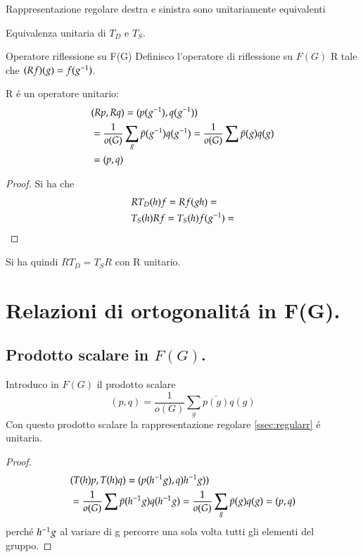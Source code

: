 \documentclass[oneside,12pt]{memoir}
\begin{document}
\begin{usefull}{Rappresentazione regolare destra e sinistra sono unitariamente equivalenti}

Equivalenza unitaria di $T_D$ e $T_S$.

\begin{definition}{Operatore riflessione su F(G)}
Definisco l'operatore di riflessione su $F(G)$ R tale che $(Rf)(g)=f({{g}^{-1}})$.
\end{definition}

R \'e un operatore unitario:
\begin{align*}
&(Rp,Rq)=(p({{g}^{-1}}),q({{g}^{-1}}))\\
&=\frac{1}{o(G)}\sum_g\bar{p}({{g}^{-1}})q({{g}^{-1}})=\frac{1}{o(G)}\sum\bar{p}(g)q(g)\\
&=(p,q)
\end{align*}

\begin{proof}
Si ha che
\begin{align*}
&RT_D(h)f=Rf(gh)=\\
&T_S(h)Rf=T_S(h)f({{g}^{-1}})=
\end{align*}
\end{proof}

Si ha quindi $RT_D=T_SR$ con R unitario.

\end{usefull}


\section{Relazioni di ortogonalit\'a in F(G).}

\subsection{Prodotto scalare in $F(G)$.}

Introduco in $F(G)$ il prodotto scalare
\begin{equation*}
(p,q)=\frac{1}{o(G)}\sum_g\bar{p(g)}q(g)
\end{equation*}
Con questo prodotto scalare la rappresentazione regolare \ref{ssec:regularr} \'e unitaria.
\begin{proof}

\begin{align*}
&(T(h)p,T(h)q)=(p({{h}^{-1}}g),q){{h}^{-1}}g))\\
&=\frac{1}{o(G)}\sum\bar{p}({{h}^{-1}}g)q({{h}^{-1}}g)=\frac{1}{o(G)}\sum_g\bar{p}(g)q(g)=(p,q)
\end{align*}
perch\'e ${{h}^{-1}}g$ al variare di g percorre una sola volta tutti gli elementi del gruppo.

\end{proof}
\end{document}
